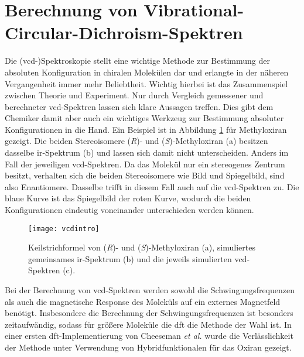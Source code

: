 \section{Berechnung von Vibrational\--Circular\--Dichroism\--Spektren}\label{kap:vcd}
Die \mbox{(\acs{vcd}-)}Spektroskopie stellt eine wichtige Methode zur Bestimmung der absoluten Konfiguration in chiralen Molekülen dar und erlangte in der näheren Vergangenheit immer mehr Beliebtheit. Wichtig hierbei ist das Zusammenspiel zwischen Theorie und Experiment. Nur durch Vergleich gemessener und berechneter \ac{vcd}-Spektren lassen sich klare Aussagen treffen. Dies gibt dem Chemiker damit aber auch ein wichtiges Werkzeug zur Bestimmung absoluter Konfigurationen in die Hand.\supercite{magyarfalvi2011vibrational} Ein Beispiel ist in Abbildung \ref{abb:vcdintro} für Methyloxiran gezeigt. Die beiden Stereoisomere (\textit{R})- und (\textit{S})-Methyloxiran \textsf{(a)} besitzen dasselbe \ac{ir}-Spektrum \textsf{(b)} und lassen sich damit nicht unterscheiden. Anders im Fall der jeweiligen \ac{vcd}-Spektren. Da das Molekül nur ein stereogenes Zentrum besitzt, verhalten sich die beiden Stereoisomere wie Bild und Spiegelbild, sind also Enantiomere. Dasselbe trifft in diesem Fall auch auf die \ac{vcd}-Spektren zu. Die blaue Kurve ist das Spiegelbild der roten Kurve, wodurch die beiden Konfigurationen eindeutig voneinander unterschieden werden können. 

\begin{figure}[ht!]
	\centering
	\texttt{[image: vcdintro]}
	\captionsetup{figurewithin = chapter}
	\captionsetup{font=small, labelfont=bf}\caption[\ac{ir}- und \ac{vcd}-Spektren von (\textit{R})- und (\textit{S})-Methyloxiran]{Keilstrichformel von (\textcolor{myblue}{\textit{R}})- und (\textcolor{myred}{\textit{S}})-Methyloxiran \textsf{(a)}, simuliertes gemeinsames \ac{ir}-Spektrum \textsf{(b)} und die jeweils simulierten \ac{vcd}-Spektren \textsf{(c)}.}
\label{abb:vcdintro}
\end{figure}

Bei der Berechnung von \ac{vcd}-Spektren werden sowohl die Schwingungsfrequenzen als auch die magnetische Response des Moleküls auf ein externes Magnetfeld benötigt.\supercite{reiter2017vibrational} Insbesondere die Berechnung der Schwingungsfrequenzen ist besonders zeitaufwändig, sodass für größere Moleküle die \ac{dft} die Methode der Wahl ist. In einer ersten \ac{dft}-Implementierung von Cheeseman \textit{et al.}\supercite{cheeseman1996ab} wurde die Verlässlichkeit der Methode unter Verwendung von Hybridfunktionalen für das Oxiran gezeigt. 
\FloatBarrier

